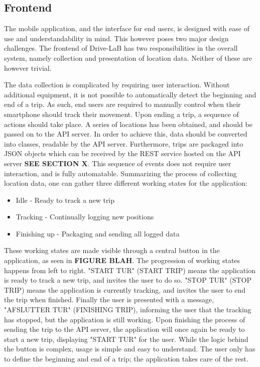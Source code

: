 \subsection{Frontend}\label{frontend_design}
The mobile application, and the interface for end users, is designed with ease of use and understandability in mind. This however poses two major design challenges. The frontend of Drive-LaB has two responsibilities in the overall system, namely collection and presentation of location data. Neither of these are however trivial.

The data collection is complicated by requiring user interaction. Without additional equipment, it is not possible to automatically detect the beginning and end of a trip. As such, end users are required to manually control when their smartphone should track their movement. Upon ending a trip, a sequence of actions should take place. A series of locations has been obtained, and should be passed on to the API server. In order to achieve this, data should be converted into classes, readable by the API server. Furthermore, trips are packaged into JSON objects which can be received by the REST service hosted on the API server \textbf{SEE SECTION X}. This sequence of events does not require user interaction, and is fully automatable. Summarizing the process of collecting location data, one can gather three different working states for the application:

\begin{itemize}
\item Idle - Ready to track a new trip
\item Tracking - Continually logging new positions
\item Finishing up - Packaging and sending all logged data
\end{itemize}

These working states are made visible through a central button in the application, as seen in \textbf{FIGURE BLAH}. The progression of working states happens from left to right. "START TUR" (START TRIP) means the application is ready to track a new trip, and invites the user to do so. "STOP TUR" (STOP TRIP) means the application is currently tracking, and invites the user to end the trip when finished. Finally the user is presented with a message, "AFSLUTTER TUR" (FINISHING TRIP), informing the user that the tracking has stopped, but the application is still working. Upon finishing the process of sending the trip to the API server, the application will once again be ready to start a new trip, displaying "START TUR" for the user.
While the logic behind the button is complex, usage is simple and easy to understand. The user only has to define the beginning and end of a trip; the application takes care of the rest.

